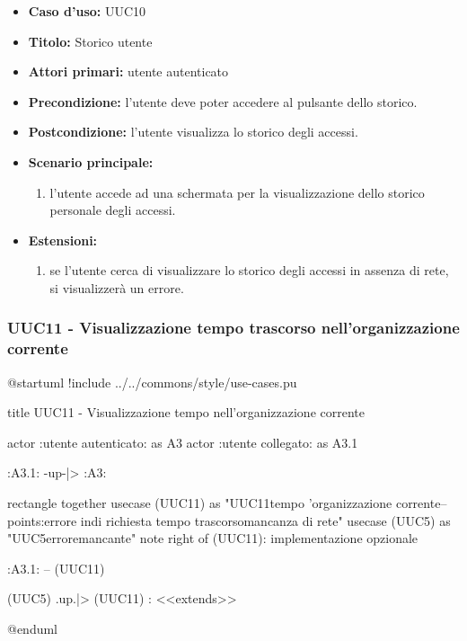 \documentclass[casi-duso]{subfiles}
\begin{document}
\begin{itemize}
  \item \textbf{Caso d’uso:} UUC10
  \item \textbf{Titolo:} Storico utente
  \item \textbf{Attori primari:} utente autenticato
  \item \textbf{Precondizione:}  l'utente deve poter accedere al pulsante dello storico.
  \item \textbf{Postcondizione:} l'utente visualizza lo storico degli accessi.
  \item \textbf{Scenario principale:}
        \begin{enumerate}
          \item l'utente accede ad una schermata per la visualizzazione dello storico personale degli accessi.
        \end{enumerate}
  \item \textbf{Estensioni:}
        \begin{enumerate}
          \item se l'utente cerca di visualizzare lo storico degli accessi in assenza di rete, si visualizzerà un errore.
        \end{enumerate}
\end{itemize}

\subsubsection{UUC11 - Visualizzazione tempo trascorso nell'organizzazione corrente}%
\label{subsub:UUC11utente}

\begin{plantuml}
@startuml
!include ../../commons/style/use-cases.pu

title UUC11 - Visualizzazione tempo nell'organizzazione corrente

actor :utente autenticato: as A3
actor :utente collegato: as A3.1

:A3.1: -up-|> :A3:

rectangle {
  together {
    usecase (UUC11) as "UUC11\nVisualizzazione tempo \nnell'organizzazione corrente\n--\nExtension points:\nVisualizzazione errore in\ncaso di richiesta tempo trascorso\nin mancanza di rete"
    usecase (UUC5) as "UUC5\nVisualizzazione errore\nrete mancante"
    note right of (UUC11): implementazione opzionale
  }
}

:A3.1: -- (UUC11)

(UUC5) .up.|> (UUC11) : <<extends>>

@enduml
\end{plantuml}
\end{document}
